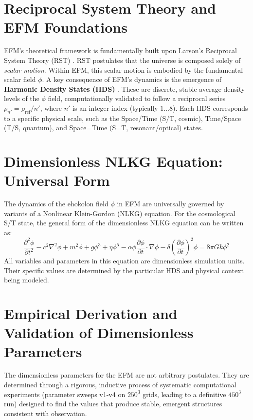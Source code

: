 \documentclass[11pt]{article}
\begin{document}
\section{Reciprocal System Theory and EFM Foundations}
EFM’s theoretical framework is fundamentally built upon Larson’s Reciprocal System Theory (RST) \citep{larson1959}. RST postulates that the universe is composed solely of \textit{scalar motion}. Within EFM, this scalar motion is embodied by the fundamental scalar field $\phi$. A key consequence of EFM's dynamics is the emergence of \textbf{Harmonic Density States (HDS)} \citep{emvula2025efm_hds_validated}. These are discrete, stable average density levels of the $\phi$ field, computationally validated to follow a reciprocal series $\rho_{n'} = \rho_{\text{ref}}/n'$, where $n'$ is an integer index (typically $1 \dots 8$). Each HDS corresponds to a specific physical scale, such as the Space/Time (S/T, cosmic), Time/Space (T/S, quantum), and Space=Time (S=T, resonant/optical) states.

\section{Dimensionless NLKG Equation: Universal Form}
The dynamics of the ehokolon field $\phi$ in EFM are universally governed by variants of a Nonlinear Klein-Gordon (NLKG) equation. For the cosmological S/T state, the general form of the dimensionless NLKG equation can be written as:
\begin{equation}
\frac{\partial^2 \phi}{\partial t^2} - c^2 \nabla^2 \phi + m^2 \phi + g \phi^3 + \eta \phi^5 - \alpha \phi \frac{\partial \phi}{\partial t} \cdot \nabla \phi - \delta \left(\frac{\partial \phi}{\partial t}\right)^2 \phi = 8 \pi G k \phi^2
\label{eq:nlkg_universal}
\end{equation}
All variables and parameters in this equation are dimensionless simulation units. Their specific values are determined by the particular HDS and physical context being modeled.

\section{Empirical Derivation and Validation of Dimensionless Parameters}
The dimensionless parameters for the EFM are not arbitrary postulates. They are determined through a rigorous, inductive process of systematic computational experiments (parameter sweeps v1-v4 on $250^3$ grids, leading to a definitive $450^3$ run) designed to find the values that produce stable, emergent structures consistent with observation.
\end{document}
